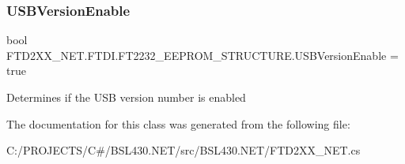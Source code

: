 \subsubsection{\texorpdfstring{USBVersionEnable}{USBVersionEnable}}
{\footnotesize\ttfamily bool F\+T\+D2\+X\+X\+\_\+\+N\+E\+T.\+F\+T\+D\+I.\+F\+T2232\+\_\+\+E\+E\+P\+R\+O\+M\+\_\+\+S\+T\+R\+U\+C\+T\+U\+R\+E.\+U\+S\+B\+Version\+Enable = true}



Determines if the U\+SB version number is enabled 



The documentation for this class was generated from the following file\+:\begin{DoxyCompactItemize}
\item 
C\+:/\+P\+R\+O\+J\+E\+C\+T\+S/\+C\#/\+B\+S\+L430.\+N\+E\+T/src/\+B\+S\+L430.\+N\+E\+T/F\+T\+D2\+X\+X\+\_\+\+N\+E\+T.\+cs\end{DoxyCompactItemize}
